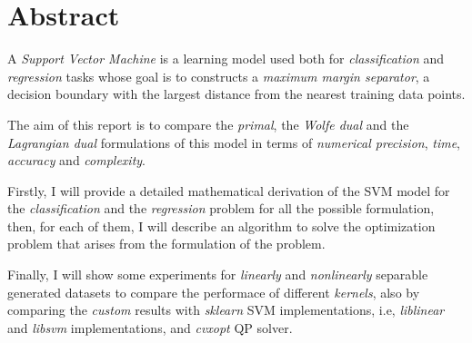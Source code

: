 \section{Abstract}

A \emph{Support Vector Machine} is a learning model used both for \emph{classification} and \emph{regression} tasks whose goal is to constructs a \emph{maximum margin separator}, a decision boundary with the largest distance from the nearest training data points.

The aim of this report is to compare the \emph{primal}, the \emph{Wolfe dual} and the \emph{Lagrangian dual} formulations of this model in terms of \emph{numerical precision}, \emph{time}, \emph{accuracy} and \emph{complexity}.

Firstly, I will provide a detailed mathematical derivation of the SVM model for the \emph{classification} and the \emph{regression} problem for all the possible formulation, then, for each of them, I will describe an algorithm to solve the optimization problem that arises from the formulation of the problem.

Finally, I will show some experiments for \emph{linearly} and \emph{nonlinearly} separable generated datasets to compare the performace of different \emph{kernels}, also by comparing the \emph{custom} results with \emph{sklearn} SVM implementations, i.e, \emph{liblinear} and \emph{libsvm} implementations, and \emph{cvxopt} QP solver.
